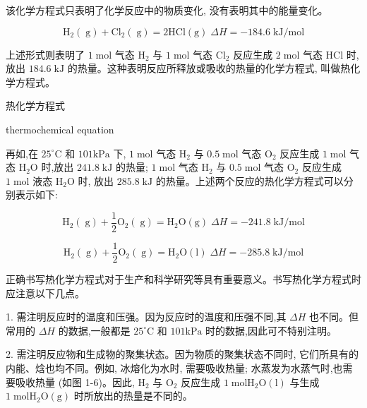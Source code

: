 \documentclass[10pt]{article}
\begin{document}
该化学方程式只表明了化学反应中的物质变化, 没有表明其中的能量变化。

\[
{\mathrm{H}}_{2}\left( \mathrm{\;g}\right) + {\mathrm{{Cl}}}_{2}\left( \mathrm{\;g}\right) = 2\mathrm{{HCl}}\left( \mathrm{g}\right) \;{\Delta H} = - {184.6}\mathrm{\;{kJ}}/\mathrm{{mol}}
\]

上述形式则表明了 \(1\mathrm{\;{mol}}\) 气态 \({\mathrm{H}}_{2}\) 与 \(1\mathrm{\;{mol}}\) 气态 \({\mathrm{{Cl}}}_{2}\) 反应生成 \(2\mathrm{\;{mol}}\) 气态 \(\mathrm{{HCl}}\) 时,放出 \({184.6}\mathrm{\;{kJ}}\) 的热量。这种表明反应所释放或吸收的热量的化学方程式, 叫做热化学方程式。

\begin{mdframed}

热化学方程式

thermochemical equation

\end{mdframed}

再如,在 \({25}^{ \circ }\mathrm{C}\) 和 \({101}\mathrm{{kPa}}\) 下, \(1\mathrm{\;{mol}}\) 气态 \({\mathrm{H}}_{2}\) 与 \({0.5}\mathrm{\;{mol}}\) 气态 \({\mathrm{O}}_{2}\) 反应生成 \(1\mathrm{\;{mol}}\) 气态 \({\mathrm{H}}_{2}\mathrm{O}\) 时,放出 \({241.8}\mathrm{\;{kJ}}\) 的热量; \(1\mathrm{\;{mol}}\) 气态 \({\mathrm{H}}_{2}\) 与 \({0.5}\mathrm{\;{mol}}\) 气态 \({\mathrm{O}}_{2}\) 反应生成 \(1\mathrm{\;{mol}}\) 液态 \({\mathrm{H}}_{2}\mathrm{O}\) 时, 放出 \({285.8}\mathrm{\;{kJ}}\) 的热量。上述两个反应的热化学方程式可以分别表示如下:

\[
{\mathrm{H}}_{2}\left( \mathrm{\;g}\right) + \frac{1}{2}{\mathrm{O}}_{2}\left( \mathrm{\;g}\right) = {\mathrm{H}}_{2}\mathrm{O}\left( \mathrm{g}\right) \;{\Delta H} = - {241.8}\mathrm{\;{kJ}}/\mathrm{{mol}}
\]

\[
{\mathrm{H}}_{2}\left( \mathrm{\;g}\right) + \frac{1}{2}{\mathrm{O}}_{2}\left( \mathrm{\;g}\right) = {\mathrm{H}}_{2}\mathrm{O}\left( \mathrm{l}\right) \;{\Delta H} = - {285.8}\mathrm{\;{kJ}}/\mathrm{{mol}}
\]

正确书写热化学方程式对于生产和科学研究等具有重要意义。书写热化学方程式时应注意以下几点。

1. 需注明反应时的温度和压强。因为反应时的温度和压强不同,其 \({\Delta H}\) 也不同。但常用的 \({\Delta H}\) 的数据,一般都是 \({25}^{ \circ }\mathrm{C}\) 和 \({101}\mathrm{{kPa}}\) 时的数据,因此可不特别注明。

2. 需注明反应物和生成物的聚集状态。因为物质的聚集状态不同时, 它们所具有的内能、焓也均不同。例如, 冰熔化为水时, 需要吸收热量; 水蒸发为水蒸气时,也需要吸收热量 (如图 1-6)。因此, \({\mathrm{H}}_{2}\) 与 \({\mathrm{O}}_{2}\) 反应生成 \(1\mathrm{\;{mol}}{\mathrm{H}}_{2}\mathrm{O}\left( \mathrm{l}\right)\) 与生成 \(1\mathrm{\;{mol}}{\mathrm{H}}_{2}\mathrm{O}\left( \mathrm{g}\right)\) 时所放出的热量是不同的。
\end{document}
